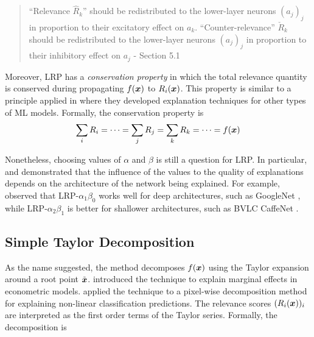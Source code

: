 \begin{quote}
``Relevance $\hat{R}_k$'' should be redistributed to the lower-layer neurons $(a_j)_j$ in proportion to their excitatory effect on $a_k$. ``Counter-relevance'' $\check{R}_k $ should be redistributed to the lower-layer neurons $(a_j)_j$ in proportion to their inhibitory effect on $a_j$
	- Section 5.1 \citep{MontavonMethodsinterpretingunderstanding2018}
\end{quote} 

Moreover, LRP  has a \textit{conservation property} in which the total relevance quantity is conserved during propagating $f(\patvector{x})$ to $R_i(\boldsymbol{x})$. This property is similar to a principle applied in \citep{PoulinVisualExplanationEvidence2006,LandeckerInterpretingindividualclassifications2013} where they developed explanation techniques for other types of ML models. Formally, the conservation property is 
\begin{align*}
	\sum_{i} R_i =  \cdots =	\sum_{j} R_j = \sum_{k} R_k = \cdots = f(\patvector{x})
\end{align*}

Nonetheless, choosing values of $\alpha$ and $\beta$ is still a question for LRP.  In particular, \citet{MontavonExplainingnonlinearclassification2017} and \citet{BinderLayerWiseRelevancePropagation2016} demonstrated that the influence of the values to the quality of explanations  depends on the architecture of the network being explained. For example, \cite{MontavonMethodsinterpretingunderstanding2018} observed that LRP-${\alpha_1\beta_0}$ works well for deep architectures, such as GoogleNet \citep{SzegedyGoingdeeperconvolutions2015}, while LRP-${\alpha_2\beta_1}$ is better for shallower architectures, such as BVLC CaffeNet \citep{JiaCaffeConvolutionalArchitecture2014}.

\subsection{Simple Taylor Decomposition}
As the name suggested,  the method decomposes $f(\patvector{x})$ using the Taylor expansion around a root point $\tilde{\patvector{x}}$. \citet{BazenTaylorDecompositionUnified2013} introduced  the technique to explain marginal effects in econometric models. \citet{BachPixelWiseExplanationsNonLinear2015} applied the technique to a pixel-wise decomposition method for explaining non-linear classification predictions. The relevance scores $(R_i(\boldsymbol{x}))_i$ are interpreted as the first order terms of the Taylor series. Formally, the decomposition is 


